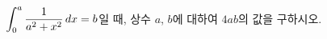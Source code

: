 \hspace*{2mm}\begin{minipage}[t]{\dimexpr\linewidth-2mm\relax}\vspace{0pt}
$\displaystyle\int_{0}^{a}\dfrac{1}{a^2+x^2}\mkern3mu dx=b$일 때, 상수 $a$, $b$에 대하여 $4ab$의 값을 구하시오. \end{minipage}
